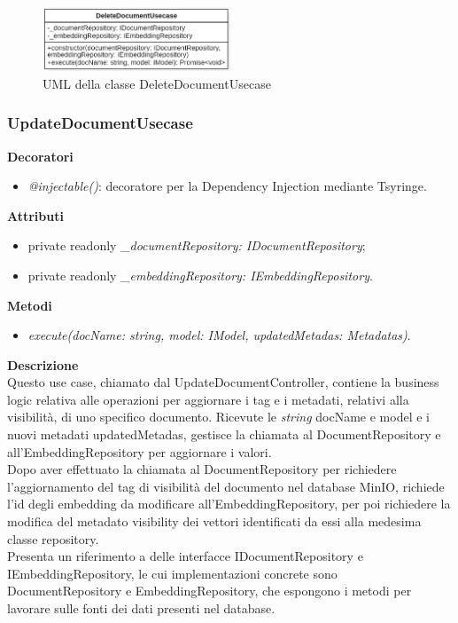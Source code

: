 \begin{figure}[h!]
    \centering  
    \includegraphics[width=0.5\textwidth]{DeleteDocumentUsecase.png}
    \caption{UML della classe DeleteDocumentUsecase}
\end{figure}

\subsubsection{UpdateDocumentUsecase}
\textbf{Decoratori}
\begin{itemize}
    \item \textit{@injectable()}: decoratore per la Dependency Injection mediante Tsyringe.
\end{itemize}
\textbf{Attributi}
\begin{itemize}[itemsep=-4pt]
    \item private readonly \textit{\_documentRepository: IDocumentRepository};
    \item private readonly \textit{\_embeddingRepository: IEmbeddingRepository}.
\end{itemize}
\textbf{Metodi}
\begin{itemize}
    \item \textit{execute(docName: string, model: IModel, updatedMetadas: Metadatas)}.
\end{itemize}
\textbf{Descrizione}\\
Questo use case, chiamato dal UpdateDocumentController, contiene la business logic relativa alle operazioni per aggiornare i tag e i metadati, relativi alla visibilità, di uno specifico documento. Ricevute le \textit{string} docName e model e i nuovi metadati updatedMetadas, gestisce la chiamata al DocumentRepository e all'EmbeddingRepository per aggiornare i valori.\\
Dopo aver effettuato la chiamata al DocumentRepository per richiedere l'aggiornamento del tag di visibilità del documento nel database MinIO, richiede l'id degli embedding da modificare all'EmbeddingRepository, per poi richiedere la modifica del metadato visibility dei vettori identificati da essi alla medesima classe repository.\\
Presenta un riferimento a delle interfacce IDocumentRepository e IEmbeddingRepository, le cui implementazioni concrete sono DocumentRepository e EmbeddingRepository, che espongono i metodi per lavorare sulle fonti dei dati presenti nel database.\\ \\
